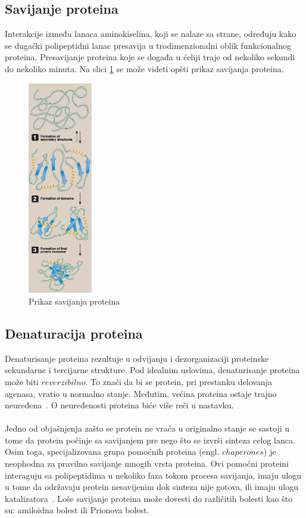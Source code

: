 \subsection{Savijanje proteina}
Interakcije između lanaca aminokiselina, koji se nalaze sa strane, određuju kako se dugački polipeptidni lanac presavija u trodimenzionalni oblik funkcionalnog proteina. Presavijanje proteina koje se događa u ćeliji traje od nekoliko sekundi do nekoliko minuta. 
Na slici \ref{fig:folding} se može videti opšti prikaz savijanja proteina.
\begin{figure}[h]
	\centering
    \includegraphics[width=0.25\textwidth]{Figures/BO/protein_folding.png}
    \caption{Prikaz savijanja proteina~\cite{lippincott}}
    \label{fig:folding}
\end{figure}

\subsection{Denaturacija proteina}
Denaturisanje proteina rezultuje u odvijanju i dezorganizaciji proteinske sekundarne i tercijarne strukture. Pod idealnim uslovima, denaturisanje proteina može biti $reverzibilno$. To znači da bi se protein, pri prestanku delovanja agenasa, vratio u normalno stanje. Međutim, većina proteina ostaje trajno neuređena~\cite{lippincott}. O neuređenosti proteina biće više reči u nastavku.\\\\
Jedno od objašnjenja zašto se protein ne vraća u originalno stanje se sastoji u tome da protein počinje sa savijanjem pre nego što se izvrši sinteza celog lanca. Osim toga, specijalizovana grupa pomoćnih proteina (engl. $chaperones$) je neophodna za pravilno savijanje mnogih vrsta proteina. Ovi pomoćni proteini interaguju sa polipeptidima u nekoliko faza tokom procesa savijanja, imaju ulogu u tome da održavaju protein nesavijenim dok sinteza nije gotova, ili imaju ulogu katalizatora~\cite{lippincott}. Loše savijanje proteina može dovesti do različitih bolesti kao što su: amiloidna bolest ili Prionova bolest.
